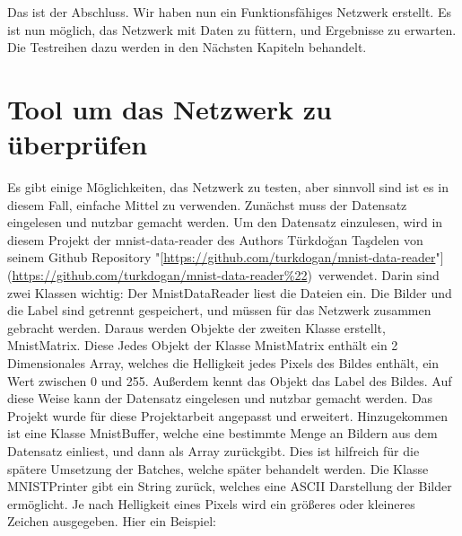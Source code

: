 \documentclass[12pt]{article}
\begin{document}
Das ist der Abschluss. Wir haben nun ein Funktionsfähiges Netzwerk erstellt. Es ist nun möglich, das Netzwerk mit Daten zu füttern, und Ergebnisse zu erwarten. Die Testreihen dazu werden in den Nächsten Kapiteln behandelt.\section{Tool um das Netzwerk zu überprüfen}
Es gibt einige Möglichkeiten, das Netzwerk zu testen, aber sinnvoll sind ist es in diesem Fall, einfache Mittel zu verwenden.
Zunächst muss der Datensatz eingelesen und nutzbar gemacht werden.
Um den Datensatz einzulesen, wird in diesem Projekt der mnist-data-reader des Authors Türkdoğan Taşdelen von seinem Github Repository "[\url{https://github.com/turkdogan/mnist-data-reader}"](\url{https://github.com/turkdogan/mnist-data-reader\%22}) verwendet. Darin sind zwei Klassen wichtig:  
Der MnistDataReader liest die Dateien ein. Die Bilder und die Label sind getrennt gespeichert, und müssen für das Netzwerk zusammen gebracht werden. Daraus werden Objekte der zweiten Klasse erstellt, MnistMatrix. Diese Jedes Objekt der Klasse MnistMatrix enthält ein 2 Dimensionales Array, welches die Helligkeit jedes Pixels des Bildes enthält, ein Wert zwischen 0 und 255. Außerdem kennt das Objekt das Label des Bildes.
Auf diese Weise kann der Datensatz eingelesen und nutzbar gemacht werden.
Das Projekt wurde für diese Projektarbeit angepasst und erweitert. Hinzugekommen ist eine Klasse MnistBuffer, welche eine bestimmte Menge an Bildern aus dem Datensatz einliest, und dann als Array zurückgibt. Dies ist hilfreich für die spätere Umsetzung der Batches, welche später behandelt werden.
Die Klasse MNISTPrinter gibt ein String zurück, welches eine ASCII Darstellung der Bilder ermöglicht. Je nach Helligkeit eines Pixels wird ein größeres oder kleineres Zeichen ausgegeben. Hier ein Beispiel:
\end{document}
